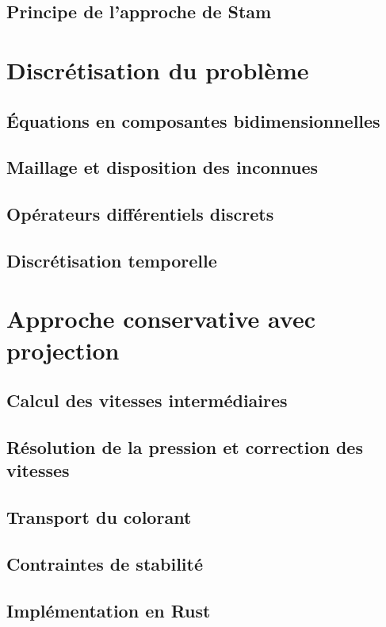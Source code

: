 \documentclass[a4paper,12pt,twoside]{article}
\begin{document}
        \subsection{Principe de l'approche de Stam}
        
    \section{Discrétisation du problème}
        \subsection{Équations en composantes bidimensionnelles}
        \subsection{Maillage et disposition des inconnues}
        \subsection{Opérateurs différentiels discrets}
        \subsection{Discrétisation temporelle}

    \section{Approche conservative avec projection}
        \subsection{Calcul des vitesses intermédiaires}
        \subsection{Résolution de la pression et correction des vitesses}
        \subsection{Transport du colorant}
        \subsection{Contraintes de stabilité}
        \subsection{Implémentation en Rust}
    
\end{document}
